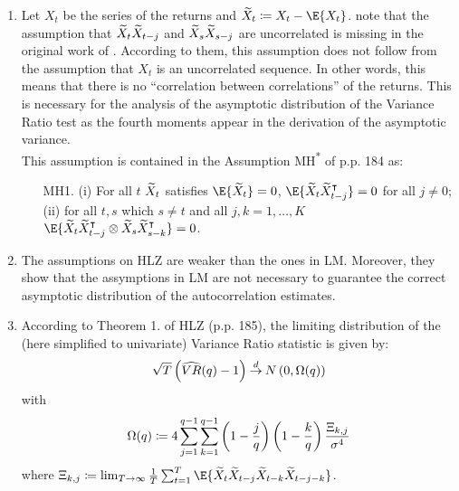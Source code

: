 \begin{solution}
    \begin{enumerate}[label = \alph*)]
        \item Let \(X_t\) be the series of the returns and \(\wt X_t \coloneqq X_t - \E{X_t}\). \citet{hong2017investigation} note that the assumption that \(\widetilde{X}_{t}\widetilde{X}_{t-j}\) and \(\widetilde{X}_{s}\widetilde{X}_{s-j}\) are uncorrelated is missing in the original work of \citet{lo1988stock}. According to them, this assumption does not follow from the assumption that \(X_t\) is an uncorrelated sequence. In other words, this means that there is no ``correlation between correlations'' of the returns. This is necessary for the analysis of the asymptotic distribution of the Variance Ratio test as the fourth moments appear in the derivation of the asymptotic variance. \\
        This assumption is contained in the Assumption MH\textsuperscript{*} of \citet{hong2017investigation} p.p. 184 as:
        \begin{itemize}
            \item[MH1.] (i) For all \(t\) \(\widetilde{X}_t\) satisfies \(\E{\wt X_t} = 0\), \(\E{\wt X_t \wt X_{t-j}^\intercal} = 0\) for all \(j \neq 0\); (ii) for all \(t,s\) which \(s\neq t\) and all \(j,k = 1, \dots, K\) \(\E{\wt X_t \wt X_{t-j}^\intercal \otimes \wt X_s \wt X_{s-k}^\intercal} = 0\).
        \end{itemize}

        \item The assumptions on HLZ are weaker than the ones in LM. Moreover, they show that the assymptions in LM are not necessary to guarantee the correct asymptotic distribution of the autocorrelation estimates. 
        
        \item According to Theorem 1. of HLZ (p.p. 185), the limiting distribution of the (here simplified to univariate) Variance Ratio statistic is given by:
        \[
            \sqrt{T}\left( \widehat{VR}{\left( q \right)}-1 \right) \mathbin{\overset{d}{\to}} N\left( 0, \Omega{\left( q \right)} \right)
        \]
        with
        \[
            \Omega{\left( q \right)} \coloneqq 4\sum_{j=1}^{q-1}\sum_{k=1}^{q-1}\left( 1-\frac{j}{q} \right)\left( 1-\frac{k}{q} \right) \frac{\Xi_{k,j}}{\sigma^4}
        \]
        where \(\Xi_{k,j} \coloneqq \lim_{T\to\infty}\frac{1}{T}\sum_{t=1}^{T}\E{\wt X_{t}\wt X_{t-j}\wt X_{t-k}\wt X_{t-j-k}}\).
    \end{enumerate}
\end{solution}
